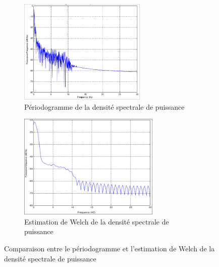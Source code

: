 \begin{figure}[ht]
    \centering
    \begin{subfigure}[b]{0.45\textwidth}
        \centering
        \includegraphics[height=5cm]{images/methode/periodogramme.png}
        \caption{Périodogramme de la densité spectrale de puissance}\label{fig:periodogramme}
    \end{subfigure}
    \begin{subfigure}[b]{0.45\textwidth}
        \centering
        \includegraphics[height=5cm]{images/methode/welch.png}
        \caption{Estimation de Welch de la densité spectrale de puissance}\label{fig:welch}
    \end{subfigure}
    \caption{Comparaison entre le périodogramme et l'estimation de Welch de la densité spectrale de puissance}\label{fig:periodogramme_welch}
\end{figure}